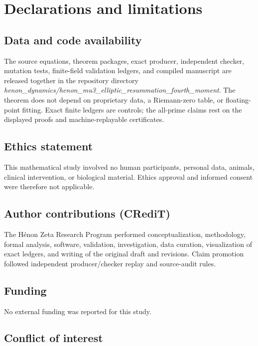 \section*{Declarations and limitations}

\subsection*{Data and code availability}

The source equations, theorem packages, exact producer, independent
checker, mutation tests, finite-field validation ledgers, and compiled
manuscript are released together in the repository directory
\emph{henon\_dynamics/henon\_mu3\_elliptic\_resummation\_fourth\_moment}.
The theorem does not depend on proprietary data, a Riemann-zero table, or
floating-point fitting.  Exact finite ledgers are controls; the all-prime
claims rest on the displayed proofs and machine-replayable certificates.

\subsection*{Ethics statement}

This mathematical study involved no human participants, personal data,
animals, clinical intervention, or biological material.  Ethics approval
and informed consent were therefore not applicable.

\subsection*{Author contributions (CRediT)}

The H\'enon Zeta Research Program performed conceptualization, methodology,
formal analysis, software, validation, investigation, data curation,
visualization of exact ledgers, and writing of the original draft and
revisions.  Claim promotion followed independent producer/checker replay and
source-audit rules.

\subsection*{Funding}

No external funding was reported for this study.

\subsection*{Conflict of interest}

